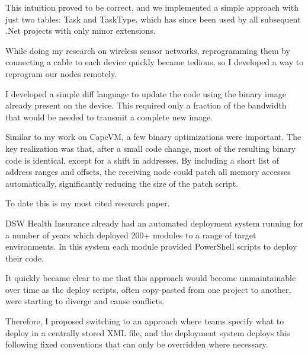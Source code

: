 \documentclass[10pt,a4paper]{../altacv}
\begin{document}
\begin{fullwidth}
\begin{itemize}
	This intuition proved to be correct, and we implemented a simple approach with just two tables: Task and TaskType, which has since been used by all subsequent .Net projects with only minor extensions.
\end{itemize}

\bigskip\bigskip

While doing my research on wireless sensor networks, reprogramming them by connecting a cable to each device quickly became tedious, so I developed a way to reprogram our nodes remotely.

\medskip\medskip

I developed a simple diff language to update the code using the binary image already present on the device. This required only a fraction of the bandwidth that would be needed to transmit a complete new image.

\medskip\medskip

Similar to my work on CapeVM, a few binary optimizations were important. The key realization was that, after a small code change, most of the resulting binary code is identical, except for a shift in addresses. By including a short list of address ranges and offsets, the receiving node could patch all memory accesses automatically, significantly reducing the size of the patch script.

\medskip\medskip

To date this is my most cited research paper.

\bigskip\bigskip

\newpage

DSW Health Insurance already had an automated deployment system running for a number of years which deployed 200+ modules to a range of target environments. In this system each module provided PowerShell scripts to deploy their code.

\medskip\medskip

It quickly became clear to me that this approach would become unmaintainable over time as the deploy scripts, often copy-pasted from one project to another, were starting to diverge and cause conflicts.

\medskip\medskip

Therefore, I proposed switching to an approach where teams specify what to deploy in a centrally stored XML file, and the deployment system deploys this following fixed conventions that can only be overridden where necessary.


\end{fullwidth}
\end{document}
